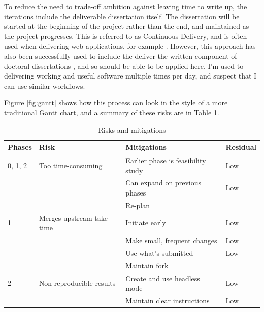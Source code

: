 \documentclass[a4paper,11pt]{article}
\begin{document}
To reduce the need to trade-off ambition against leaving time to write up, the iterations include the deliverable dissertation itself. The dissertation will be started at the beginning of the project rather than the end, and maintained as the project progresses. This is referred to as Continuous Delivery, and is often used when delivering web applications, for example \cite{chen_continuous_2015}. However, this approach has also been successfully used to include the deliver the written component of doctoral dissertations \cite{alipui_agile_nodate}, and so should be able to be applied here. I'm used to delivering working and useful software multiple times per day, and suspect that I can use similar workflows.

Figure \ref{fig:gantt} shows how this process can look in the style of a more traditional Gantt chart, and a summary of these risks are in Table \ref{fig:risks}.

\begin{table}[htbp]
    \begin{center}
        \begin{tabular}{|l|l|l|l|}
        \hline
        \textbf{Phases} & \textbf{Risk} & \textbf{Mitigations} & \textbf{Residual} \\
        \hline
        0, 1, 2 & Too time-consuming        & Earlier phase is feasibility study & Low \\
                &                           & Can expand on previous phases      & Low \\
                &                           & Re-plan                            & \\
        1       & Merges upstream take time & Initiate early                     & Low \\
                &                           & Make small, frequent changes       & Low \\
                &                           & Use what's submitted               & Low \\
                &                           & Maintain fork                      & \\
        2       & Non-reproducible results  & Create and use headless mode       & Low \\
                &                           & Maintain clear instructions        & Low \\
        \hline
        \end{tabular} 
    \end{center}
    \caption[Risks and mitigations]{Risks and mitigations}
    \label{fig:risks}
\end{table}
\end{document}
